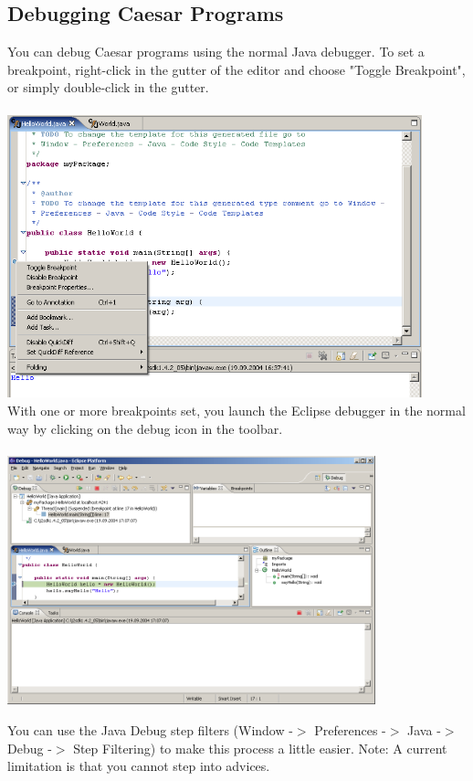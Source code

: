 \subsection{Debugging Caesar Programs}
You can debug Caesar programs using the normal Java debugger. To set a breakpoint, right-click in the gutter of the editor and choose "Toggle Breakpoint", or simply double-click in the gutter.\\\\
\includegraphics[width=0.90\textwidth]{images/brake_point.png}\\

With one or more breakpoints set, you launch the Eclipse debugger in the normal way by clicking on the debug icon in the toolbar.\\\\
\includegraphics[width=0.80\textwidth]{images/debug1.png}\newpage

You can use the Java Debug step filters (Window -$>$ Preferences -$>$ Java -$>$ Debug -$>$ Step Filtering) to make this process a little easier.
Note: A current limitation is that you cannot step into advices.